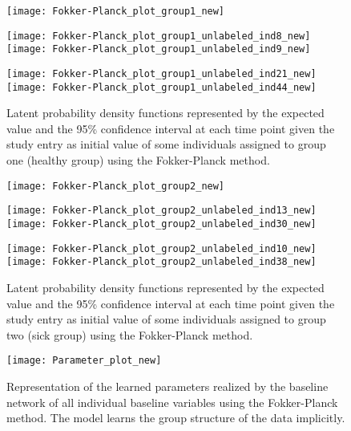 \documentclass[11pt,titlepage]{article}
\theoremstyle{definition}
\theoremstyle{remark}
\begin{document}
	\begin{figure}[!h]
		\begin{minipage}[m]{\textwidth}
			\texttt{[image: Fokker-Planck\_plot\_group1\_new]}
		\end{minipage}
		\begin{minipage}[m]{\textwidth}
			\texttt{[image: Fokker-Planck\_plot\_group1\_unlabeled\_ind8\_new]}
			\texttt{[image: Fokker-Planck\_plot\_group1\_unlabeled\_ind9\_new]}
		\end{minipage}
		\begin{minipage}[m]{\textwidth}
			\texttt{[image: Fokker-Planck\_plot\_group1\_unlabeled\_ind21\_new]}
			\texttt{[image: Fokker-Planck\_plot\_group1\_unlabeled\_ind44\_new]}
		\end{minipage}
		\caption{Latent probability density functions represented by the expected value and the 95\% confidence interval at each time point given the study entry as initial value of some individuals assigned to group one (healthy group) using the Fokker-Planck method.}\label{Res:Method FP Group1}
	\end{figure}

	\begin{figure}[!h]
		\begin{minipage}[m]{\textwidth}
			\texttt{[image: Fokker-Planck\_plot\_group2\_new]}
		\end{minipage}
		\begin{minipage}[m]{\textwidth}
			\texttt{[image: Fokker-Planck\_plot\_group2\_unlabeled\_ind13\_new]}
			\texttt{[image: Fokker-Planck\_plot\_group2\_unlabeled\_ind30\_new]}
		\end{minipage}
		\begin{minipage}[m]{\textwidth}
			\texttt{[image: Fokker-Planck\_plot\_group2\_unlabeled\_ind10\_new]}
			\texttt{[image: Fokker-Planck\_plot\_group2\_unlabeled\_ind38\_new]}
		\end{minipage}
		\caption{Latent probability density functions represented by the expected value and the 95\% confidence interval at each time point given the study entry as initial value of some individuals assigned to group two (sick group) using the Fokker-Planck method.}\label{Res:Method FP Group2}
	\end{figure}
	\newpage
	
	\begin{figure}[!h]
		\centering
		\texttt{[image: Parameter\_plot\_new]}
		\caption{Representation of the learned parameters realized by the baseline network of all individual baseline variables using the Fokker-Planck method. The model learns the group structure of the data implicitly.}\label{Res:Method FP Parameters}
	\end{figure}
	
\end{document}
